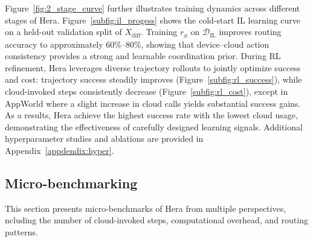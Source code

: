 \documentclass{article}
\newcommand{\name}{Hera\xspace}
\begin{document}

Figure~\ref{fig:2_stage_curve} further illustrates training dynamics across different stages of \name.
Figure~\ref{subfig:il_progess} shows the cold-start IL learning curve on a held-out validation split of $X_{\text{diff}}$.
Training $r_\phi$ on $\mathcal{D}_{\mathrm{IL}}$ improves routing accuracy to approximately 60\%--80\%, showing that device--cloud action consistency provides a strong and learnable coordination prior.
During RL refinement, \name leverages diverse trajectory rollouts to jointly optimize success and cost: trajectory success steadily improves (Figure~\ref{subfig:rl_success}), while cloud-invoked steps consistently decrease (Figure~\ref{subfig:rl_cost}), except in AppWorld where a slight increase in cloud calls yields substantial success gains.
As a results, \name achieve the highest success rate with the lowest cloud usage, demonstrating the effectiveness of carefully designed learning signals. Additional hyperparameter studies and ablations are provided in Appendix~\ref{appdendix:hyper}.

\vspace{-.5em}
\subsection{Micro-benchmarking}
This section presents micro-benchmarks of \name from multiple perspectives, ncluding the number of cloud-invoked steps, computational overhead, and routing patterns.
\end{document}
